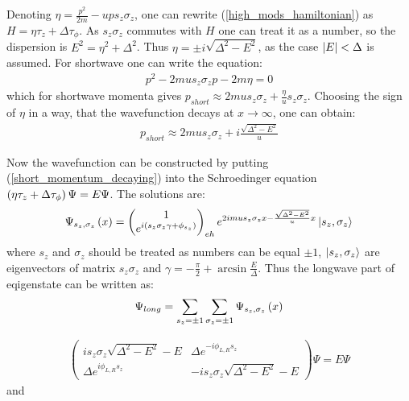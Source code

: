 Denoting $ \eta = \frac{p^2}{2m}-ups_z\sigma_z $, one can rewrite (\ref{high_mods_hamiltonian}) as $ H=\eta\tau_z+\Delta\tau_\phi $. As $ s_z\sigma_z $ commutes with $ H $ one can treat it as a number, so the dispersion is $ E^2 =\eta^2+\Delta^2 $. Thus $ \eta=\pm i\sqrt{\Delta^2-E^2} $, as the case $ \left|E\right|<\Delta $ is assumed. For shortwave one can write the equation:
\begin{gather}
	p^2-2mu s_z \sigma_z p - 2m \eta =0
\end{gather}
which for shortwave momenta gives $ p_{short}\approx2 mu s_z \sigma_z + \frac{\eta}{u}s_z\sigma_z$. Choosing the sign of $ \eta $ in a way, that the wavefunction decays at $ x\to \infty $, one can obtain:
\begin{gather}
\label{short_momentum_decaying}
	p_{short}\approx
	2 mu s_z \sigma_z 
	+
	i\frac{\sqrt{\Delta^2-E^2}}{u}
\end{gather}


Now the wavefunction can be constructed by putting (\ref{short_momentum_decaying}) into the Schroedinger equation $ \left(\eta\tau_z +\Delta\tau_\phi\right)\Psi=E\Psi $. The solutions are:
\begin{gather}
	\Psi_{s_z,\sigma_z}\left(x\right)
	=
	\begin{pmatrix}
	1
	\\
	e^{i\left(s_z\sigma_z\gamma+\phi_{s_z}\right)}
	\end{pmatrix}_{eh}
	e^{2imus_z\sigma_zx -\frac{\sqrt{\Delta^2-E^2}}{u}x}
	\ket{s_z, \sigma_z}
\end{gather}
where $ s_z $ and $ \sigma_z $
 should be treated as numbers can be equal $ \pm1 $, $ \ket{s_z, \sigma_z} $ are eigenvectors of matrix $ s_z \sigma_z $ and $ \gamma = -\frac{\pi}{2}+\arcsin\frac{E}{\Delta} $.
Thus the longwave part of eqigenstate can be written as:
\begin{gather}
	\Psi_{long}
	=
	\sum_{s_z=\pm 1}
	\sum_{\sigma_z=\pm 1}
	\Psi_{s_z,\sigma_z}\left(x\right)
\end{gather}
 
\begin{gather}
\begin{pmatrix}
i s_z \sigma_z\sqrt{\Delta^2-E^2}-E & \Delta e^{-i\phi_{L,R} s_z} \\
\Delta e^{i\phi_{L,R} s_z} & -i s_z \sigma_z\sqrt{\Delta^2-E^2}-E
\end{pmatrix}
\Psi
=
E\Psi
\end{gather}
\fi
and